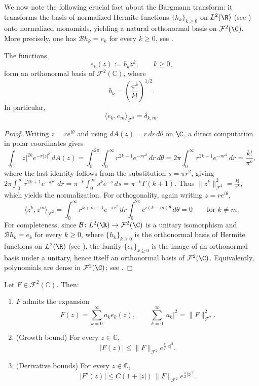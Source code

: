 \medskip

We now note the following crucial fact about the Bargmann transform: it
transforms the basis of normalized Hermite functions \(\{h_k\}_{k\geq 0}\) on
\(L^2(\R)\) (see \cite{Thangavelu}) onto normalized monomials, yielding a
natural orthonormal basis on $\mathcal{F}^2(\C).$ More precisely, one has
\(\mathcal B h_k=e_k\) for every \(k\ge 0\), see \cite{Bargmann,Folland,Grochenig}.

\begin{lemma}\label{lem:monomials}
The functions
\[
e_k(z) := b_k z^k, \qquad k \ge 0,
\]
form an orthonormal basis of $\mathcal{F}^2(\mathbb{C})$, where
\[
b_k = \left( \frac{\pi^k}{k!} \right)^{1/2}.
\]
In particular,
\[
\langle e_k, e_m \rangle_{\mathcal{F}^2} = \delta_{k,m}.
\]
\end{lemma}

\begin{proof}
Writing \(z=re^{i\theta}\) and using \(dA(z)=r\,dr\,d\theta\) on \(\C\),
a direct computation in polar coordinates gives
\[
\int_{\mathbb{C}} |z|^{2k} e^{-\pi |z|^2}\,dA(z)
= \int_0^{2\pi}\!\!\int_0^\infty r^{2k+1} e^{-\pi r^2}\,dr\,d\theta
= 2\pi \int_0^\infty r^{2k+1} e^{-\pi r^2}\,dr
= \frac{k!}{\pi^k},
\]
where the last identity follows from the substitution \(s=\pi r^2\), giving
\(2\pi\int_0^\infty r^{2k+1}e^{-\pi r^2}\,dr=\pi^{-k}\int_0^\infty s^k e^{-s}\,ds
=\pi^{-k}\Gamma(k+1)\). Thus
\(\|z^k\|_{\mathcal{F}^2}^2 = \frac{k!}{\pi^k}\), which yields the normalization.
For orthogonality, again writing \(z=re^{i\theta}\),
\[
\langle z^k,z^m\rangle_{\mathcal F^2}
=
\int_0^\infty r^{k+m+1}e^{-\pi r^2}\,dr\int_0^{2\pi}e^{i(k-m)\theta}\,d\theta
=
0
\qquad\text{for }k\neq m.
\]
For completeness, since \(\mathcal B\colon L^2(\R)\to \mathcal F^2(\C)\) is a
unitary isomorphism and \(\mathcal Bh_k=e_k\) for every \(k\ge 0\), where
\(\{h_k\}_{k\ge 0}\) is the orthonormal basis of Hermite functions on
\(L^2(\R)\) (see \cite{Thangavelu}), the family \(\{e_k\}_{k\ge 0}\) is the
image of an orthonormal basis under a unitary, hence itself an orthonormal
basis of \(\mathcal F^2(\C)\). Equivalently, polynomials are dense in
\(\mathcal F^2(\C)\); see \cite{Bargmann,Zhu}.
\end{proof}

\medskip

\begin{lemma}\label{lem:growth}
Let $F \in \mathcal{F}^2(\mathbb{C})$. Then:
\begin{enumerate}
\item[(i)] $F$ admits the expansion
\[
F(z) = \sum_{k=0}^\infty a_k e_k(z),
\qquad \sum_{k=0}^\infty |a_k|^2 = \|F\|_{\mathcal{F}^2}^2.
\]

\item[(ii)] (Growth bound) For every $z \in \mathbb{C}$,
\[
|F(z)| \le \|F\|_{\mathcal{F}^2} e^{\frac{\pi}{2}|z|^2}.
\]

\item[(iii)] (Derivative bounds) For every $z \in \mathbb{C}$,
\[
|F'(z)| \le C(1+|z|)\, \|F\|_{\mathcal{F}^2} e^{\frac{\pi}{2}|z|^2}.
\]
\end{enumerate}
\end{lemma}

